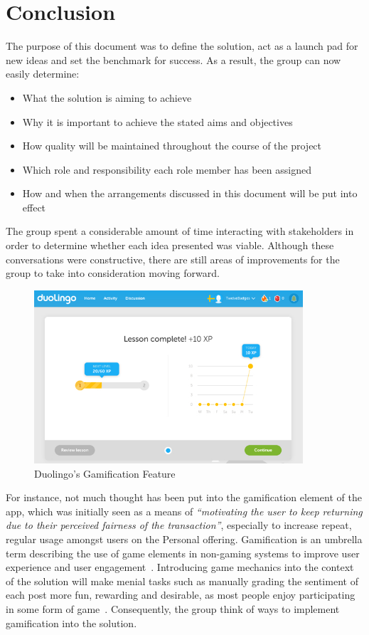 \section{Conclusion}

The purpose of this document was to define the solution, act as a launch pad for new ideas and set the benchmark for success. As a result, the group can now easily determine:

\begin{itemize}
  \item What the solution is aiming to achieve
  \item Why it is important to achieve the stated aims and objectives
  \item How quality will be maintained throughout the course of the project
  \item Which role and responsibility each role member has been assigned
  \item How and when the arrangements discussed in this document will be put into effect
\end{itemize}

The group spent a considerable amount of time interacting with stakeholders in order to determine whether each idea presented was viable. Although these conversations were constructive, there are still areas of improvements for the group to take into consideration moving forward. 

\begin{figure}
  \begin{minipage}{10cm}
    \centering
    \includegraphics[width=10cm]{inc/duolingo_gamification.jpg}
    \caption{Duolingo's Gamification Feature}
    \label{fig:duolingo_gamification}
  \end{minipage}
\end{figure}

For instance, not much thought has been put into the gamification element of the app, which was initially seen as a means of \emph{``motivating the user to keep returning due to their perceived fairness of the transaction''}, especially to increase repeat, regular usage amongst users on the Personal offering. Gamification is an umbrella term describing the use of game elements in non-gaming systems to improve user experience and user engagement~\parencite{deterding2011gamification}. Introducing game mechanics into the context of the solution will make menial tasks such as manually grading the sentiment of each post more fun, rewarding and desirable, as most people enjoy participating in some form of game~\parencite{hagglund2012taking}. Consequently, the group think of ways to implement gamification into the solution.

